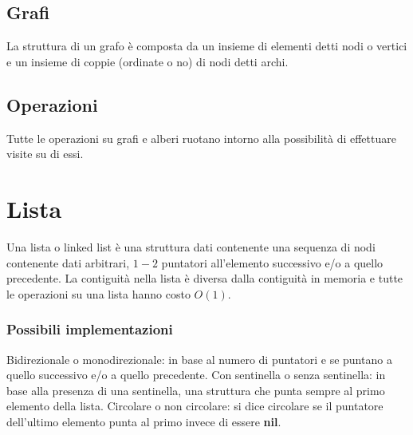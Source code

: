 \subsection{Grafi}
La struttura di un grafo \`e composta da un insieme di elementi detti nodi o vertici e un insieme di coppie (ordinate o no) di nodi detti archi.
\subsection{Operazioni}
Tutte le operazioni su grafi e alberi ruotano intorno alla possibilit\`a di effettuare visite su di essi.
\section{Lista}
Una lista o linked list \`e una struttura dati contenente una sequenza di nodi contenente dati arbitrari, $1-2$ puntatori all'elemento successivo e/o a 
quello precedente. La contiguit\`a nella lista \`e diversa dalla contiguit\`a in memoria e tutte le operazioni su una lista hanno costo $O(1)$.
\subsubsection{Possibili implementazioni}
Bidirezionale o monodirezionale: in base al numero di puntatori e se puntano a quello successivo e/o a quello precedente.
Con sentinella o senza sentinella: in base alla presenza di una sentinella, una struttura che punta sempre al primo elemento della lista.
Circolare o non circolare: si dice circolare se il puntatore dell'ultimo elemento punta al primo invece di essere \textbf{nil}.

